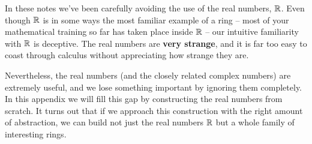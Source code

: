 In these notes we've been carefully avoiding the use of the real numbers, \(\mathbb{R}\).
Even though \(\mathbb{R}\) is in some ways the most familiar example of a ring -- most of your mathematical training so far has taken place inside \(\mathbb{R}\) -- our intuitive familiarity with \(\mathbb{R}\) is deceptive.
The real numbers are \textbf{very strange}, and it is far too easy to coast through calculus without appreciating how strange they are.

Nevertheless, the real numbers (and the closely related complex numbers) are extremely useful, and we lose something important by ignoring them completely.
In this appendix we will fill this gap by constructing the real numbers from scratch.
It turns out that if we approach this construction with the right amount of abstraction, we can build not just the real numbers \(\mathbb{R}\) but a whole family of interesting rings.
